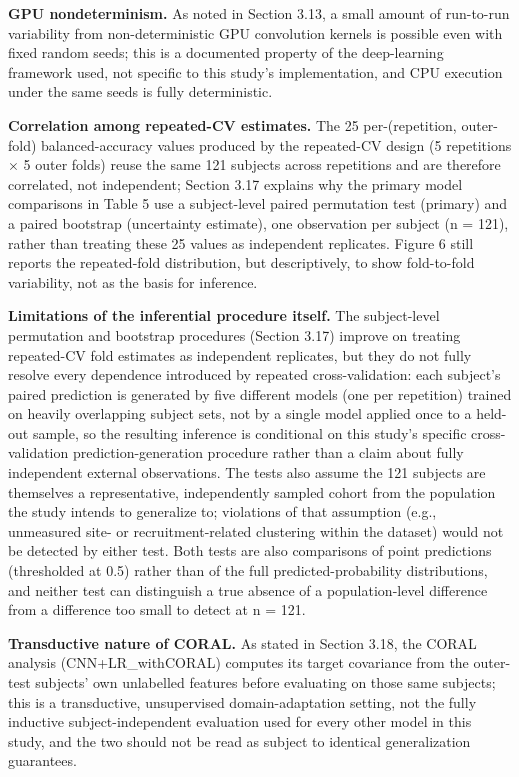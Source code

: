 \documentclass[a4paper,fleqn]{cas-sc}
\begin{document}
\textbf{GPU nondeterminism.} As noted in Section 3.13, a small amount of run-to-run variability from non-deterministic GPU convolution kernels is possible even with fixed random seeds; this is a documented property of the deep-learning framework used, not specific to this study's implementation, and CPU execution under the same seeds is fully deterministic.



\textbf{Correlation among repeated-CV estimates.} The 25 per-(repetition, outer-fold) balanced-accuracy values produced by the repeated-CV design (5 repetitions $\times$ 5 outer folds) reuse the same 121 subjects across repetitions and are therefore correlated, not independent; Section 3.17 explains why the primary model comparisons in Table 5 use a subject-level paired permutation test (primary) and a paired bootstrap (uncertainty estimate), one observation per subject (n = 121), rather than treating these 25 values as independent replicates. Figure 6 still reports the repeated-fold distribution, but descriptively, to show fold-to-fold variability, not as the basis for inference.



\textbf{Limitations of the inferential procedure itself.} The subject-level permutation and bootstrap procedures (Section 3.17) improve on treating repeated-CV fold estimates as independent replicates, but they do not fully resolve every dependence introduced by repeated cross-validation: each subject's paired prediction is generated by five different models (one per repetition) trained on heavily overlapping subject sets, not by a single model applied once to a held-out sample, so the resulting inference is conditional on this study's specific cross-validation prediction-generation procedure rather than a claim about fully independent external observations. The tests also assume the 121 subjects are themselves a representative, independently sampled cohort from the population the study intends to generalize to; violations of that assumption (e.g., unmeasured site- or recruitment-related clustering within the dataset) would not be detected by either test. Both tests are also comparisons of point predictions (thresholded at 0.5) rather than of the full predicted-probability distributions, and neither test can distinguish a true absence of a population-level difference from a difference too small to detect at n = 121.



\textbf{Transductive nature of CORAL.} As stated in Section 3.18, the CORAL analysis (CNN+LR\_withCORAL) computes its target covariance from the outer-test subjects' own unlabelled features before evaluating on those same subjects; this is a transductive, unsupervised domain-adaptation setting, not the fully inductive subject-independent evaluation used for every other model in this study, and the two should not be read as subject to identical generalization guarantees.
\end{document}
